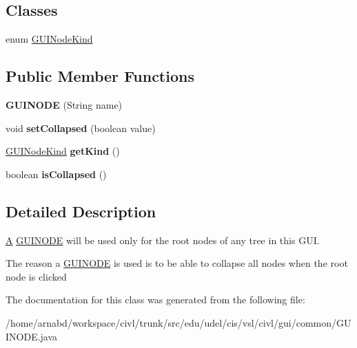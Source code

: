 \subsection*{Classes}
\begin{DoxyCompactItemize}
\item 
enum \hyperlink{enumedu_1_1udel_1_1cis_1_1vsl_1_1civl_1_1gui_1_1common_1_1GUINODE_1_1GUINodeKind}{G\+U\+I\+Node\+Kind}
\end{DoxyCompactItemize}
\subsection*{Public Member Functions}
\begin{DoxyCompactItemize}
\item 
\hypertarget{classedu_1_1udel_1_1cis_1_1vsl_1_1civl_1_1gui_1_1common_1_1GUINODE_a1b68bd9612371f3d6f86bb7cad761dc2}{}{\bfseries G\+U\+I\+N\+O\+D\+E} (String name)\label{classedu_1_1udel_1_1cis_1_1vsl_1_1civl_1_1gui_1_1common_1_1GUINODE_a1b68bd9612371f3d6f86bb7cad761dc2}

\item 
\hypertarget{classedu_1_1udel_1_1cis_1_1vsl_1_1civl_1_1gui_1_1common_1_1GUINODE_a9d566ea6679bda64da33eb3ee7c777a5}{}void {\bfseries set\+Collapsed} (boolean value)\label{classedu_1_1udel_1_1cis_1_1vsl_1_1civl_1_1gui_1_1common_1_1GUINODE_a9d566ea6679bda64da33eb3ee7c777a5}

\item 
\hypertarget{classedu_1_1udel_1_1cis_1_1vsl_1_1civl_1_1gui_1_1common_1_1GUINODE_ad16befbd0f983bfad6db82345f4950af}{}\hyperlink{enumedu_1_1udel_1_1cis_1_1vsl_1_1civl_1_1gui_1_1common_1_1GUINODE_1_1GUINodeKind}{G\+U\+I\+Node\+Kind} {\bfseries get\+Kind} ()\label{classedu_1_1udel_1_1cis_1_1vsl_1_1civl_1_1gui_1_1common_1_1GUINODE_ad16befbd0f983bfad6db82345f4950af}

\item 
\hypertarget{classedu_1_1udel_1_1cis_1_1vsl_1_1civl_1_1gui_1_1common_1_1GUINODE_ae1b7d33170b67c3f64c7fd18bf0a44ad}{}boolean {\bfseries is\+Collapsed} ()\label{classedu_1_1udel_1_1cis_1_1vsl_1_1civl_1_1gui_1_1common_1_1GUINODE_ae1b7d33170b67c3f64c7fd18bf0a44ad}

\end{DoxyCompactItemize}


\subsection{Detailed Description}
\hyperlink{structA}{A} \hyperlink{classedu_1_1udel_1_1cis_1_1vsl_1_1civl_1_1gui_1_1common_1_1GUINODE}{G\+U\+I\+N\+O\+D\+E} will be used only for the root nodes of any tree in this G\+U\+I. 

The reason a \hyperlink{classedu_1_1udel_1_1cis_1_1vsl_1_1civl_1_1gui_1_1common_1_1GUINODE}{G\+U\+I\+N\+O\+D\+E} is used is to be able to collapse all nodes when the root node is clicked 

The documentation for this class was generated from the following file\+:\begin{DoxyCompactItemize}
\item 
/home/arnabd/workspace/civl/trunk/src/edu/udel/cis/vsl/civl/gui/common/G\+U\+I\+N\+O\+D\+E.\+java\end{DoxyCompactItemize}
